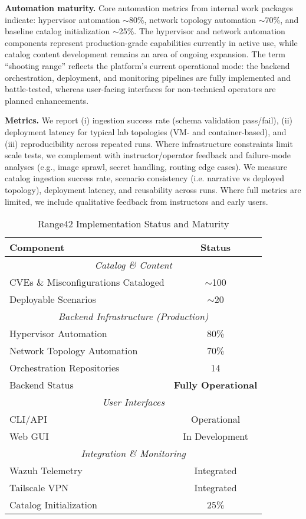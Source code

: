 \documentclass[11pt]{article}
\begin{document}
\textbf{Automation maturity.} 
Core automation metrics from internal work packages indicate: 
hypervisor automation $\sim$80\%, 
network topology automation $\sim$70\%, 
and baseline catalog initialization $\sim$25\%.
The hypervisor and network automation components represent production-grade capabilities currently in active use,
while catalog content development remains an area of ongoing expansion.
The term ``shooting range'' reflects the platform's current operational mode: 
the backend orchestration, deployment, and monitoring pipelines are fully implemented and battle-tested,
whereas user-facing interfaces for non-technical operators are planned enhancements.

\textbf{Metrics.} 
We report (i) ingestion success rate (schema validation pass/fail), 
(ii) deployment latency for typical lab topologies (VM- and container-based), 
and (iii) reproducibility across repeated runs.
Where infrastructure constraints limit scale tests, 
we complement with instructor/operator feedback and failure-mode analyses 
(e.g., image sprawl, secret handling, routing edge cases).
We measure catalog ingestion success rate, 
scenario consistency (i.e. narrative vs deployed topology), 
deployment latency, 
and reusability across runs. 
Where full metrics are limited, 
we include qualitative feedback from instructors and early users.

\begin{table}[h]
\centering
\caption{Range42 Implementation Status and Maturity}
\label{tab:implementation}
\begin{tabular}{lc}
\hline
\textbf{Component} & \textbf{Status} \\
\hline
\multicolumn{2}{c}{\textit{Catalog \& Content}} \\
CVEs \& Misconfigurations Cataloged & $\sim$100 \\
Deployable Scenarios & $\sim$20 \\
\hline
\multicolumn{2}{c}{\textit{Backend Infrastructure (Production)}} \\
Hypervisor Automation & 80\% \\
Network Topology Automation & 70\% \\
Orchestration Repositories & 14 \\
Backend Status & \textbf{Fully Operational} \\
\hline
\multicolumn{2}{c}{\textit{User Interfaces}} \\
CLI/API & Operational \\
Web GUI & In Development \\
\hline
\multicolumn{2}{c}{\textit{Integration \& Monitoring}} \\
Wazuh Telemetry & Integrated \\
Tailscale VPN & Integrated \\
Catalog Initialization & 25\% \\
\hline
\end{tabular}
\end{table}
\end{document}
